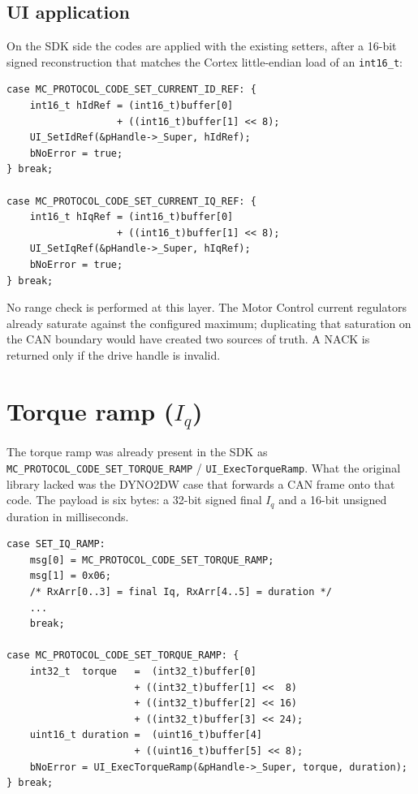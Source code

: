 \subsection{UI application}
On the SDK side the codes are applied with the existing setters, after a
16-bit signed reconstruction that matches the Cortex little-endian load of
an \texttt{int16\_t}:

\begin{lstlisting}[style=cstyle,caption={UI dispatch for independent current references.}]
case MC_PROTOCOL_CODE_SET_CURRENT_ID_REF: {
    int16_t hIdRef = (int16_t)buffer[0]
                   + ((int16_t)buffer[1] << 8);
    UI_SetIdRef(&pHandle->_Super, hIdRef);
    bNoError = true;
} break;

case MC_PROTOCOL_CODE_SET_CURRENT_IQ_REF: {
    int16_t hIqRef = (int16_t)buffer[0]
                   + ((int16_t)buffer[1] << 8);
    UI_SetIqRef(&pHandle->_Super, hIqRef);
    bNoError = true;
} break;
\end{lstlisting}

No range check is performed at this layer. The Motor Control current
regulators already saturate against the configured maximum; duplicating
that saturation on the CAN boundary would have created two sources of
truth. A NACK is returned only if the drive handle is invalid.

\section{Torque ramp ($I_q$)}
\label{sec:iq-ramp}

The torque ramp was already present in the SDK as
\texttt{MC\_PROTOCOL\_CODE\_SET\_TORQUE\_RAMP} /
\texttt{UI\_ExecTorqueRamp}. What the original library lacked was the
DYNO2DW case that forwards a CAN frame onto that code. The payload is
six bytes: a 32-bit signed final $I_q$ and a 16-bit unsigned duration in
milliseconds.

\begin{lstlisting}[style=cstyle,caption={Torque-ramp translation and SDK dispatch.}]
case SET_IQ_RAMP:
    msg[0] = MC_PROTOCOL_CODE_SET_TORQUE_RAMP;
    msg[1] = 0x06;
    /* RxArr[0..3] = final Iq, RxArr[4..5] = duration */
    ...
    break;

case MC_PROTOCOL_CODE_SET_TORQUE_RAMP: {
    int32_t  torque   =  (int32_t)buffer[0]
                      + ((int32_t)buffer[1] <<  8)
                      + ((int32_t)buffer[2] << 16)
                      + ((int32_t)buffer[3] << 24);
    uint16_t duration =  (uint16_t)buffer[4]
                      + ((uint16_t)buffer[5] << 8);
    bNoError = UI_ExecTorqueRamp(&pHandle->_Super, torque, duration);
} break;
\end{lstlisting}

